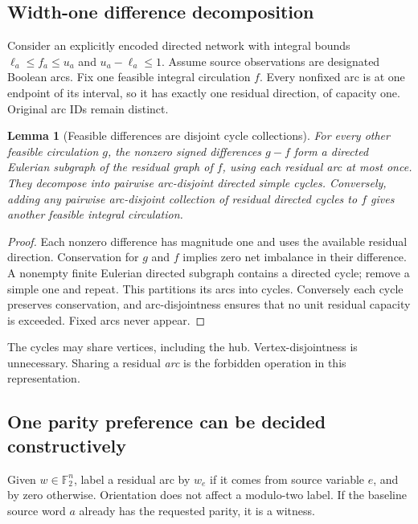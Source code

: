 \documentclass[11pt,letterpaper]{article}
\newtheorem{lemma}[theorem]{Lemma}
\theoremstyle{definition}
\newcommand{\F}{\mathbb F_2}
\begin{document}
\subsection{Width-one difference decomposition}

Consider an explicitly encoded directed network with integral bounds $\ell_a\le f_a\le u_a$ and $u_a-\ell_a\le1$. Assume source observations are designated Boolean arcs. Fix one feasible integral circulation $f$. Every nonfixed arc is at one endpoint of its interval, so it has exactly one residual direction, of capacity one. Original arc IDs remain distinct.

\begin{lemma}[Feasible differences are disjoint cycle collections]\label{lem:cycles}
For every other feasible circulation $g$, the nonzero signed differences $g-f$ form a directed Eulerian subgraph of the residual graph of $f$, using each residual arc at most once. They decompose into pairwise arc-disjoint directed simple cycles. Conversely, adding any pairwise arc-disjoint collection of residual directed cycles to $f$ gives another feasible integral circulation.
\end{lemma}
\begin{proof}
Each nonzero difference has magnitude one and uses the available residual direction. Conservation for $g$ and $f$ implies zero net imbalance in their difference. A nonempty finite Eulerian directed subgraph contains a directed cycle; remove a simple one and repeat. This partitions its arcs into cycles. Conversely each cycle preserves conservation, and arc-disjointness ensures that no unit residual capacity is exceeded. Fixed arcs never appear.
\end{proof}

The cycles may share vertices, including the hub. Vertex-disjointness is unnecessary. Sharing a residual \emph{arc} is the forbidden operation in this representation.

\subsection{One parity preference can be decided constructively}

Given $w\in\F^n$, label a residual arc by $w_e$ if it comes from source variable $e$, and by zero otherwise. Orientation does not affect a modulo-two label. If the baseline source word $a$ already has the requested parity, it is a witness.
\end{document}

